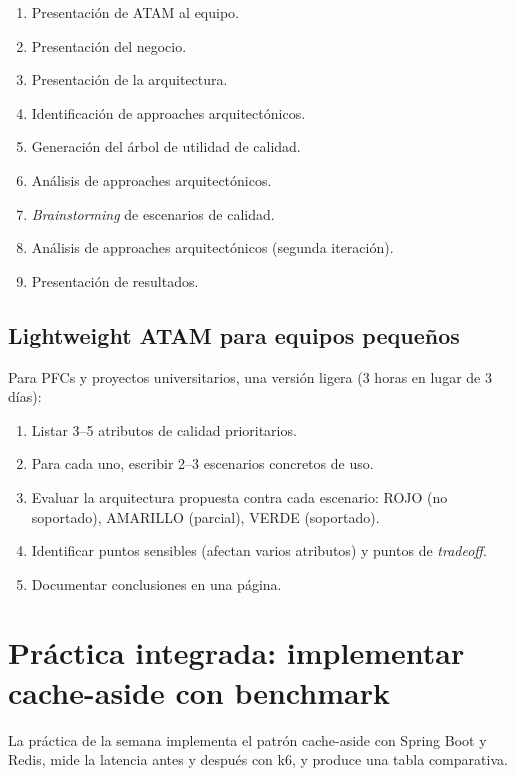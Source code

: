 \begin{enumerate}
\item Presentación de ATAM al equipo.
\item Presentación del negocio.
\item Presentación de la arquitectura.
\item Identificación de approaches arquitectónicos.
\item Generación del árbol de utilidad de calidad.
\item Análisis de approaches arquitectónicos.
\item \emph{Brainstorming} de escenarios de calidad.
\item Análisis de approaches arquitectónicos (segunda iteración).
\item Presentación de resultados.
\end{enumerate}

\subsection{Lightweight ATAM para equipos pequeños}

Para PFCs y proyectos universitarios, una versión ligera (3 horas en
lugar de 3 días):

\begin{enumerate}
\item Listar 3--5 atributos de calidad prioritarios.
\item Para cada uno, escribir 2--3 escenarios concretos de uso.
\item Evaluar la arquitectura propuesta contra cada escenario:
ROJO (no soportado), AMARILLO (parcial), VERDE (soportado).
\item Identificar puntos sensibles (afectan varios atributos) y
puntos de \emph{tradeoff}.
\item Documentar conclusiones en una página.
\end{enumerate}

\section{Práctica integrada: implementar cache-aside con benchmark}

La práctica de la semana implementa el patrón cache-aside
con Spring Boot y Redis, mide la latencia antes y después con k6, y
produce una tabla comparativa.


